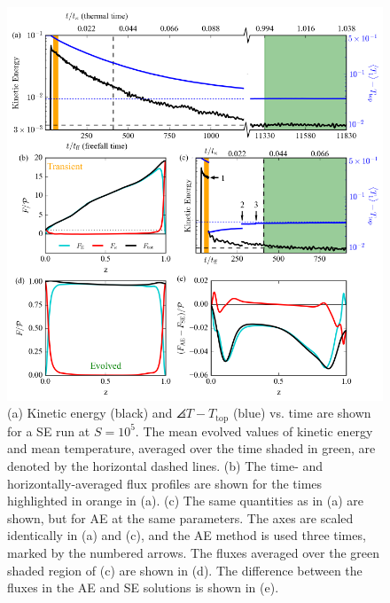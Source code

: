 \begin{figure}[p!]
\includegraphics[width=\textwidth]{./figs/time_trace.pdf}
\caption[Time evolution traces of an AE and SE convective simulation]{(a) Kinetic energy (black) and $\angles{T} - T_{\text{top}}$ (blue)  vs. time are shown
for a SE run at $S = 10^5$. The mean evolved values of kinetic energy and mean temperature,
averaged over the time shaded in green,
are denoted by the horizontal dashed lines. (b) The time- and horizontally-averaged
flux profiles are shown for the times highlighted in orange in (a).
(c) The same quantities as in (a) are shown, but for AE at the same parameters.
The axes are scaled identically in (a) and (c), and the AE method is used three times, marked by
the numbered arrows. The fluxes averaged over the green shaded region of (c)
are shown in (d). The difference between
the fluxes in the AE and SE solutions is shown in (e). \label{fig:time_trace} }
\end{figure}

